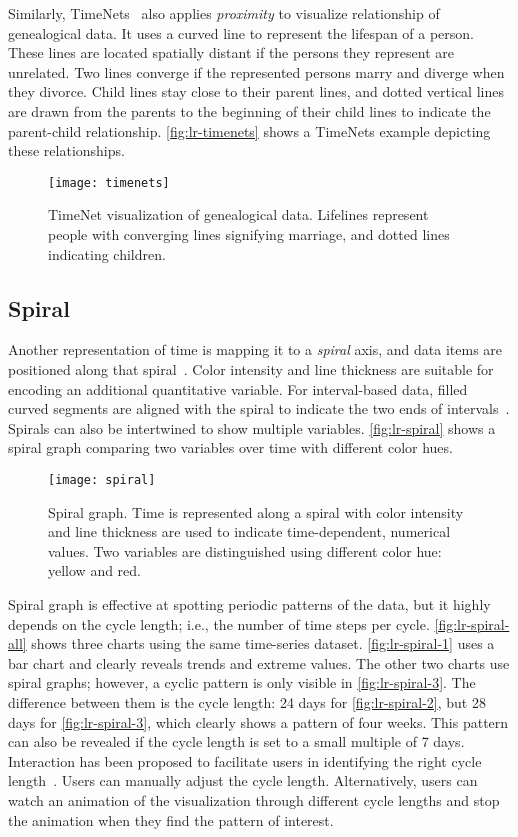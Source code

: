 Similarly, TimeNets~\cite{Kim2010} also applies \emph{proximity} to visualize relationship of genealogical data. It uses a curved line to represent the lifespan of a person. These lines are located spatially distant if the persons they represent are unrelated. Two lines converge if the represented persons marry and diverge when they divorce. Child lines stay close to their parent lines, and dotted vertical lines are drawn from the parents to the beginning of their child lines to indicate the parent-child relationship. \autoref{fig:lr-timenets} shows a TimeNets example depicting these relationships.

\begin{figure}[!htb]
	\centering
	\texttt{[image: timenets]}
	\caption{TimeNet visualization of genealogical data. Lifelines represent people with converging lines signifying marriage, and dotted lines indicating children. }
	\label{fig:lr-timenets}
\end{figure}

\subsection{Spiral}
Another representation of time is mapping it to a \emph{spiral} axis, and data items are positioned along that spiral~\cite{Weber2001}. Color intensity and line thickness are suitable for encoding an additional quantitative variable. For interval-based data, filled curved segments are aligned with the spiral to indicate the two ends of intervals~\cite{Carlis1998}. Spirals can also be intertwined to show multiple variables. \autoref{fig:lr-spiral} shows a spiral graph comparing two variables over time with different color hues. 

\begin{figure}[!htb]
	\centering
	\texttt{[image: spiral]}
	\caption{Spiral graph. Time is represented along a spiral with color intensity and line thickness are used to indicate time-dependent, numerical values. Two variables are distinguished using different color hue: yellow and red. }
	\label{fig:lr-spiral}
\end{figure}

Spiral graph is effective at spotting periodic patterns of the data, but it highly depends on the cycle length; i.e., the number of time steps per cycle. \autoref{fig:lr-spiral-all} shows three charts using the same time-series dataset. \autoref{fig:lr-spiral-1} uses a bar chart and clearly reveals trends and extreme values. The other two charts use spiral graphs; however, a cyclic pattern is only visible in \autoref{fig:lr-spiral-3}. The difference between them is the cycle length: 24 days for \autoref{fig:lr-spiral-2}, but 28 days for \autoref{fig:lr-spiral-3}, which clearly shows a pattern of four weeks. This pattern can also be revealed if the cycle length is set to a small multiple of 7 days. Interaction has been proposed to facilitate users in identifying the right cycle length~\cite{Weber2001,Tominski2008}. Users can manually adjust the cycle length. Alternatively, users can watch an animation of the visualization through different cycle lengths and stop the animation when they find the pattern of interest.

